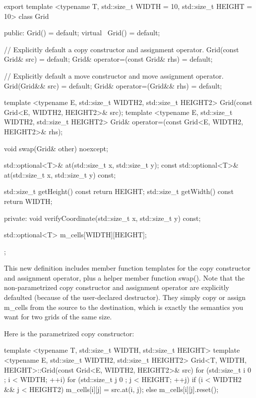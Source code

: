 \begin{cpp}
export template <typename T, std::size_t WIDTH = 10, std::size_t HEIGHT = 10>
class Grid
{
    public:
        Grid() = default;
        virtual ~Grid() = default;

        // Explicitly default a copy constructor and assignment operator.
        Grid(const Grid& src) = default;
        Grid& operator=(const Grid& rhs) = default;

        // Explicitly default a move constructor and move assignment operator.
        Grid(Grid&& src) = default;
        Grid& operator=(Grid&& rhs) = default;

        template <typename E, std::size_t WIDTH2, std::size_t HEIGHT2>
        Grid(const Grid<E, WIDTH2, HEIGHT2>& src);
        template <typename E, std::size_t WIDTH2, std::size_t HEIGHT2>
        Grid& operator=(const Grid<E, WIDTH2, HEIGHT2>& rhs);

        void swap(Grid& other) noexcept;

        std::optional<T>& at(std::size_t x, std::size_t y);
        const std::optional<T>& at(std::size_t x, std::size_t y) const;

        std::size_t getHeight() const { return HEIGHT; }
        std::size_t getWidth() const { return WIDTH; }

    private:
        void verifyCoordinate(std::size_t x, std::size_t y) const;

        std::optional<T> m_cells[WIDTH][HEIGHT];
};
\end{cpp}

This new definition includes member function templates for the copy constructor and assignment operator, plus a helper member function swap(). Note that the non-parametrized copy constructor and assignment operator are explicitly defaulted (because of the user-declared destructor). They simply copy or assign m\_cells from the source to the destination, which is exactly the semantics you want for two grids of the same size.

Here is the parametrized copy constructor:

\begin{cpp}
template <typename T, std::size_t WIDTH, std::size_t HEIGHT>
template <typename E, std::size_t WIDTH2, std::size_t HEIGHT2>
Grid<T, WIDTH, HEIGHT>::Grid(const Grid<E, WIDTH2, HEIGHT2>& src)
{
    for (std::size_t i { 0 }; i < WIDTH; ++i) {
        for (std::size_t j { 0 }; j < HEIGHT; ++j) {
            if (i < WIDTH2 && j < HEIGHT2) {
                m_cells[i][j] = src.at(i, j);
            } else {
                m_cells[i][j].reset();
            }
        }
    }
}
\end{cpp}

